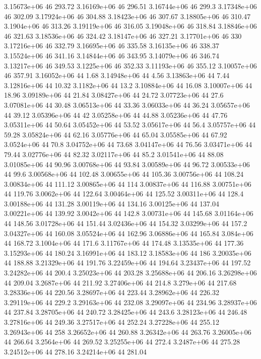 3.15673e+06 46 293.72
3.16169e+06 46 296.51
3.16744e+06 46 299.3
3.17348e+06 46 302.09
3.17924e+06 46 304.88
3.18423e+06 46 307.67
3.18805e+06 46 310.47
3.1904e+06 46 313.26
3.19119e+06 46 316.05
3.19048e+06 46 318.84
3.18846e+06 46 321.63
3.18536e+06 46 324.42
3.18147e+06 46 327.21
3.17701e+06 46 330
3.17216e+06 46 332.79
3.16695e+06 46 335.58
3.16135e+06 46 338.37
3.15524e+06 46 341.16
3.14844e+06 46 343.95
3.14079e+06 46 346.74
3.13217e+06 46 349.53
3.1225e+06 46 352.33
3.11193e+06 46 355.12
3.10057e+06 46 357.91
3.16052e+06 44 1.68
3.14948e+06 44 4.56
3.13863e+06 44 7.44
3.12816e+06 44 10.32
3.1182e+06 44 13.2
3.10884e+06 44 16.08
3.10007e+06 44 18.96
3.09189e+06 44 21.84
3.08427e+06 44 24.72
3.07723e+06 44 27.6
3.07081e+06 44 30.48
3.06513e+06 44 33.36
3.06033e+06 44 36.24
3.05657e+06 44 39.12
3.05396e+06 44 42
3.05258e+06 44 44.88
3.05236e+06 44 47.76
3.05311e+06 44 50.64
3.05452e+06 44 53.52
3.05617e+06 44 56.4
3.05757e+06 44 59.28
3.05824e+06 44 62.16
3.05776e+06 44 65.04
3.05585e+06 44 67.92
3.0524e+06 44 70.8
3.04752e+06 44 73.68
3.04147e+06 44 76.56
3.03471e+06 44 79.44
3.02776e+06 44 82.32
3.02117e+06 44 85.2
3.01541e+06 44 88.08
3.01085e+06 44 90.96
3.00768e+06 44 93.84
3.00589e+06 44 96.72
3.00533e+06 44 99.6
3.00568e+06 44 102.48
3.00655e+06 44 105.36
3.00756e+06 44 108.24
3.00834e+06 44 111.12
3.00865e+06 44 114
3.00837e+06 44 116.88
3.00751e+06 44 119.76
3.0062e+06 44 122.64
3.00464e+06 44 125.52
3.00311e+06 44 128.4
3.00188e+06 44 131.28
3.00119e+06 44 134.16
3.00125e+06 44 137.04
3.00221e+06 44 139.92
3.0042e+06 44 142.8
3.00731e+06 44 145.68
3.01164e+06 44 148.56
3.01728e+06 44 151.44
3.02436e+06 44 154.32
3.03299e+06 44 157.2
3.04327e+06 44 160.08
3.05524e+06 44 162.96
3.06886e+06 44 165.84
3.084e+06 44 168.72
3.1004e+06 44 171.6
3.11767e+06 44 174.48
3.13535e+06 44 177.36
3.15293e+06 44 180.24
3.16991e+06 44 183.12
3.18583e+06 44 186
3.20035e+06 44 188.88
3.21329e+06 44 191.76
3.22459e+06 44 194.64
3.23437e+06 44 197.52
3.24282e+06 44 200.4
3.25023e+06 44 203.28
3.25688e+06 44 206.16
3.26298e+06 44 209.04
3.2687e+06 44 211.92
3.27406e+06 44 214.8
3.279e+06 44 217.68
3.28336e+06 44 220.56
3.28697e+06 44 223.44
3.28962e+06 44 226.32
3.29119e+06 44 229.2
3.29163e+06 44 232.08
3.29097e+06 44 234.96
3.28937e+06 44 237.84
3.28705e+06 44 240.72
3.28425e+06 44 243.6
3.28123e+06 44 246.48
3.27816e+06 44 249.36
3.27517e+06 44 252.24
3.27228e+06 44 255.12
3.26943e+06 44 258
3.26652e+06 44 260.88
3.26342e+06 44 263.76
3.26005e+06 44 266.64
3.2564e+06 44 269.52
3.25255e+06 44 272.4
3.2487e+06 44 275.28
3.24512e+06 44 278.16
3.24214e+06 44 281.04
